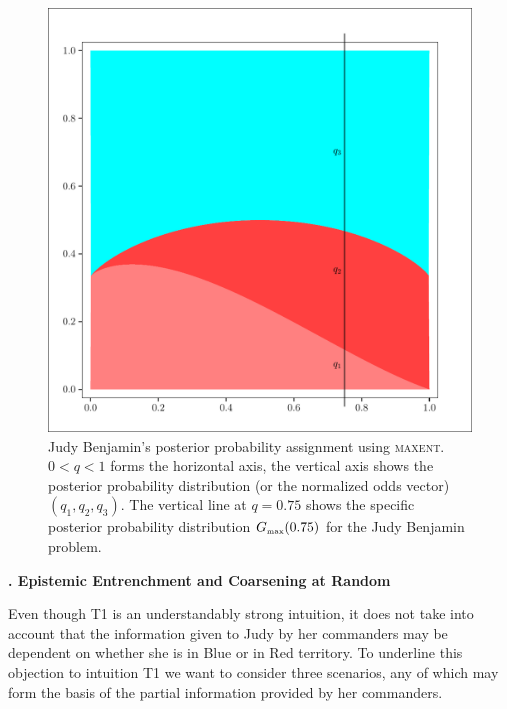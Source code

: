 \documentclass[12pt]{article}
\newcommand{\kapt}[1]{\noindent \textbf{{\thechap}. #1}\addtocounter{chap}{1}}
\def\lwv{.6}
\newcommand{\nias}{\noindent} %
\begin{document}
\begin{figure}[h]
  \begin{flushright}
    \begin{minipage}[h]{\lwv\linewidth}
      \includegraphics[width=\textwidth]{zeroone-mxnt.pdf}
      \caption{Judy Benjamin's posterior probability assignment using
        \textsc{maxent}. $0<q<1$ forms the horizontal axis, the
        vertical axis shows the posterior probability distribution (or
        the normalized odds vector) $(q_{1},q_{2},q_{3})$. The
        vertical line at $q=0.75$ shows the specific posterior
        probability distribution $G_{\mbox{\tiny max}}(0.75)$ for the Judy
        Benjamin problem.}
      \label{fig:mxnt}
    \end{minipage}
  \end{flushright}
\end{figure}

\medskip

\kapt{Epistemic Entrenchment and Coarsening at Random}

\nias Even though T1 is an understandably strong intuition, it does
not take into account that the information given to Judy by her
commanders may be dependent on whether she is in Blue or in Red
territory. To underline this objection to intuition T1 we want to
consider three scenarios, any of which may form the basis of the
partial information provided by her commanders.
\end{document}
